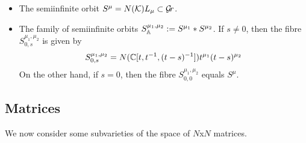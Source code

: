 \documentclass{article}
\begin{document}
\begin{itemize}
    \item The semiinfinite orbit $ S^\mu = N(\cK)L_\mu \subset \Gr $.  
    \item The family of semiinfinite orbits $ S^{\mu_1, \mu_2}_\AA := S^{\mu_1} * S^{\mu_2}$.  If $ s \ne 0 $, then the fibre $S^{\mu_1, \mu_2}_{0,s} $ is given by
    $$
    S^{\mu_1, \mu_2}_{0,s} = N(\CC[t, t^{-1}, (t-s)^{-1}])t^{\mu_1} (t-s)^{\mu_2}
    $$
    On the other hand, if $ s = 0$, then the fibre $S^{\mu_1, \mu_2}_{0,0} $ equals $ S^\mu$.
    
    
\end{itemize}

\subsection{Matrices}
We now consider some subvarieties of the space of $ N$x$N$ matrices.  

\end{document}
